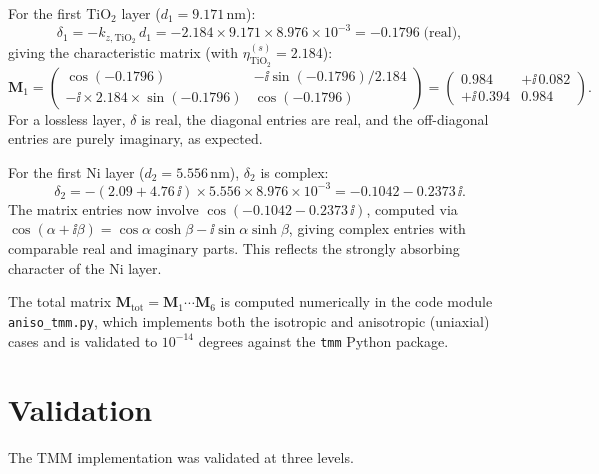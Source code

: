 For the first TiO$_2$ layer ($d_1 = 9.171$\,nm):
\begin{equation}
  \delta_1 = -k_{z,\mathrm{TiO_2}}\,d_1
           = -2.184 \times 9.171 \times 8.976 \times 10^{-3}
           = -0.1796\;\text{(real)},
  \label{eq:ch5_delta1}
\end{equation}
giving the characteristic matrix (with $\eta_{\mathrm{TiO_2}}^{(s)} = 2.184$):
\begin{equation}
  \bm{M}_1 = \begin{pmatrix}
    \cos(-0.1796) & -\ii\sin(-0.1796)/2.184 \\
    -\ii\times 2.184\times\sin(-0.1796) & \cos(-0.1796)
  \end{pmatrix}
  = \begin{pmatrix}
    0.984 & +\ii\,0.082 \\
    +\ii\,0.394 & 0.984
  \end{pmatrix}.
  \label{eq:ch5_M1_numerical}
\end{equation}
For a lossless layer, $\delta$ is real, the diagonal entries are real, and
the off-diagonal entries are purely imaginary, as expected.

For the first Ni layer ($d_2 = 5.556$\,nm), $\delta_2$ is complex:
\begin{equation}
  \delta_2 = -(2.09 + 4.76\,\ii) \times 5.556 \times 8.976 \times 10^{-3}
           = -0.1042 - 0.2373\,\ii.
  \label{eq:ch5_delta2}
\end{equation}
The matrix entries now involve $\cos(-0.1042 - 0.2373\,\ii)$, computed via
$\cos(\alpha + \ii\beta) = \cos\alpha\cosh\beta - \ii\sin\alpha\sinh\beta$,
giving complex entries with comparable real and imaginary parts. This reflects
the strongly absorbing character of the Ni layer.

The total matrix $\bm{M}_\text{tot} = \bm{M}_1\cdots\bm{M}_6$ is computed
numerically in the code module \texttt{aniso\_tmm.py}, which implements both
the isotropic and anisotropic (uniaxial) cases and is validated to $10^{-14}$
degrees against the \texttt{tmm} Python package.

\section{Validation}

The TMM implementation was validated at three levels.

